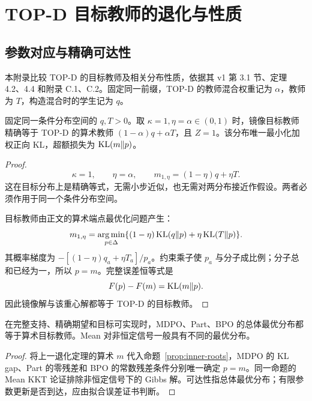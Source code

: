 \chapter{TOP-D 目标教师的退化与性质}
\label{app:topd}
\section{参数对应与精确可达性}
本附录比较 TOP-D 的目标教师及相关分布性质，依据其 v1 第 3.1 节、定理 4.2、4.4 和附录 C.1、C.2。固定同一前缀，TOP-D 的教师混合权重记为 $\alpha$，教师为 $T$，构造混合时的学生记为 $q$。
\begin{theorem}
固定同一条件分布空间的 $q,T>0$。取 $\kappa=1,\eta=\alpha\in(0,1)$ 时，镜像目标教师精确等于 TOP-D 的算术教师 $(1-\alpha)q+\alpha T$，且 $Z=1$。该分布唯一最小化加权正向 KL，超额损失为 $\operatorname{KL}(m\Vert p)$。
\end{theorem}
\begin{proof}
\begin{equation}
\boxed{\kappa=1,\qquad \eta=\alpha,\qquad
m_{1,\eta}=(1-\eta)q+\eta T.}
\label{eq:topd-match}
\end{equation}
这在目标分布上是精确等式，无需小步近似，也无需对两分布接近作假设。两者必须作用于同一个条件分布空间。

目标教师由正文的算术端点最优化问题产生：
\begin{equation}
m_{1,\eta}=\operatorname*{arg\,min}_{p\in\Delta}
\{(1-\eta)\operatorname{KL}(q\Vert p)+\eta\operatorname{KL}(T\Vert p)\}.
\end{equation}
其概率梯度为 $-[(1-\eta)q_a+\eta T_a]/p_a$。约束乘子使 $p_a$ 与分子成比例；分子总和已经为一，所以 $p=m$。完整误差恒等式是
\begin{equation}
F(p)-F(m)=\operatorname{KL}(m\Vert p).
\end{equation}
因此镜像解与该重心解都等于 TOP-D 的目标教师。
\end{proof}

\begin{corollary}[算术教师的总体可达性]
在完整支持、精确期望和目标可实现时，MDPO、Part、BPO 的总体最优分布都等于算术目标教师。Mean 对非恒定信号一般具有不同的最优分布。
\end{corollary}
\begin{proof}
将上一退化定理的算术 $m$ 代入命题~\ref{prop:inner-roots}，MDPO 的 KL gap、Part 的零残差和 BPO 的常数残差条件分别唯一确定 $p=m$。同一命题的 Mean KKT 论证排除非恒定信号下的 Gibbs 解。可达性指总体最优分布；有限参数更新是否到达，应由拟合误差证书判断。
\end{proof}

